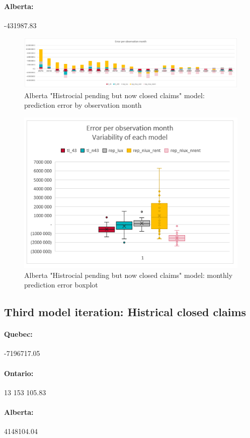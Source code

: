 	\paragraph{Alberta:}
		-431987.83
		\begin{figure}[H]
			\begin{center}
				\includegraphics[scale=0.2]{Graphiques/AB_closedonly_model_by_month} 
				\renewcommand{\figurename}{Figure}
				\caption{Alberta "Histrocial pending but now closed claims" model: prediction error by observation month}\label{Fig_AB_closedonly_er_by_month}
			\end{center}
		\end{figure}
		\begin{figure}[H]
			\begin{center}
				\includegraphics[scale=0.2]{Graphiques/AB_closedonly_model_mustach} 
				\renewcommand{\figurename}{Figure}
				\caption{Alberta "Histrocial pending but now closed claims" model: monthly prediction error boxplot}\label{Fig_AB_closedonly_er_boxplot}
			\end{center}
		\end{figure}
	
\subsection{Third model iteration: Histrical closed claims }
	\paragraph{Quebec:}
		-7196717.05
	\paragraph{Ontario:}
		13 153 105.83
	\paragraph{Alberta:}
		4148104.04
		 